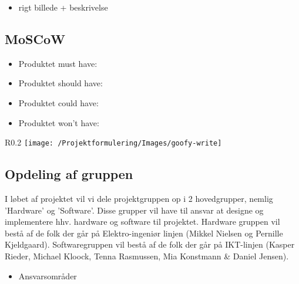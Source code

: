 \begin{itemize}
	\item{rigt billede + beskrivelse}
\end{itemize}


\subsection{MoSCoW}
\begin{itemize}
	\item{Produktet must have:}
	\item{Produktet should have:}
	\item{Produktet could have:}
	\item{Produktet won't have:}
\end{itemize}

\begin{wrapfigure}{R}{0.2\textwidth}
	\texttt{[image: /Projektformulering/Images/goofy-write]}
\end{wrapfigure}
\subsection{Opdeling af gruppen}
I løbet af projektet vil vi dele projektgruppen op i 2 hovedgrupper, nemlig 'Hardware' og 'Software'. Disse grupper vil have til ansvar at designe og implementere hhv. hardware og software til projektet. Hardware gruppen vil bestå af de folk der går på Elektro-ingeniør linjen (Mikkel Nielsen og Pernille Kjeldgaard). Softwaregruppen vil bestå af de folk der går på IKT-linjen (Kasper Rieder, Michael Kloock, Tenna Rasmussen, Mia Konstmann \& Daniel Jensen).
\begin{itemize}
	\item{Ansvarsområder}
\end{itemize}

